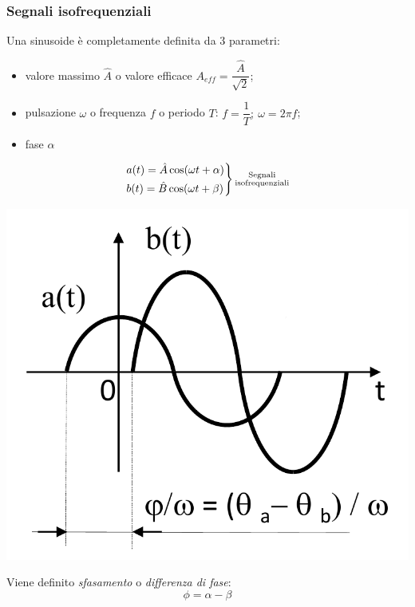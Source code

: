 \documentclass{article}
\begin{document}
\subsubsection{Segnali isofrequenziali}
Una sinusoide è completamente definita da 3 parametri:
\begin{itemize}
    \item valore massimo $\hat A$ o valore efficace $A_{eff} = \dfrac{\hat A}{\sqrt{2}}$;
    \item pulsazione $\omega$ o frequenza $f$ o periodo $T$: $f=\dfrac{1}{T}; \ \omega=2\pi f$;
    \item fase $\alpha$
\end{itemize}
\[
    \begin{rcases}
        a(t) = \hat A \cos(\omega t + \alpha)\\
        b(t) = \hat B \cos(\omega t + \beta)
    \end{rcases}
    \substack{\text{Segnali}\\ \text{isofrequenziali}}
\]
\begin{center}
    \includegraphics[scale=0.3]{Image/Regime_sinusoidale_1.png}
\end{center}
Viene definito \textit{sfasamento} o \textit{differenza di fase}:
\[
    \phi = \alpha - \beta
\]
\end{document}
